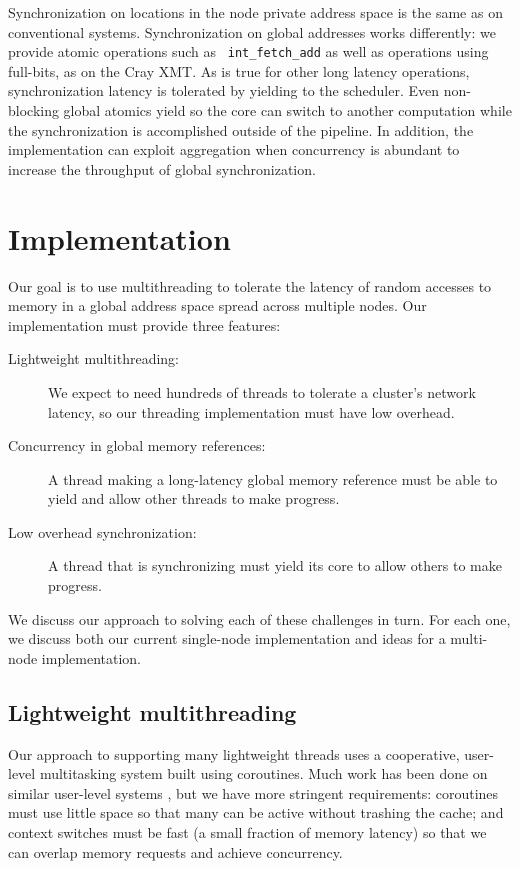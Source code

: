 \documentclass[10pt,nocopyrightspace,preprint]{sigplanconf}
\begin{document}
Synchronization on locations in the node private address space is the
same as on conventional systems.  Synchronization on global addresses
works differently: we provide atomic operations such as {\tt
  int\_fetch\_add} as well as operations using full-bits, as on
the Cray XMT.  As is true for other long latency operations,
synchronization latency is tolerated by yielding to the scheduler.
Even non-blocking global atomics yield so the core can switch to
another computation while the synchronization is accomplished outside
of the pipeline.  In addition, the implementation can exploit
aggregation when concurrency is abundant to increase the throughput of
global synchronization.

\section{Implementation}
\label{sec:approach}
Our goal is to use multithreading to tolerate
the latency of random accesses to memory in a global address space
spread across multiple nodes.  Our implementation must provide three features:
\begin{description}
\item[Lightweight multithreading:] We expect to need hundreds of
  threads to tolerate a cluster's network latency, so our threading
  implementation must have low overhead.

\item[Concurrency in global memory references:] A thread making a
  long-latency global memory reference must be able to yield and allow
  other threads to make progress.

\item[Low overhead synchronization:] 
  A thread that is synchronizing must yield its core to allow others to make progress.
\end{description}
We discuss our approach to solving each of these challenges in
turn. For each one, we discuss both our current single-node
implementation and ideas for a multi-node implementation.

\subsection{Lightweight multithreading}

Our approach to supporting many lightweight threads uses a
cooperative, user-level multitasking system built using
coroutines. Much work has been done on similar user-level systems
\cite{ult,capriccio}, but we have more stringent requirements:
coroutines must use little space so that many can be active without
trashing the cache; and context switches must be fast (a small
fraction of memory latency) so that we can overlap memory requests and
achieve concurrency.
\end{document}
